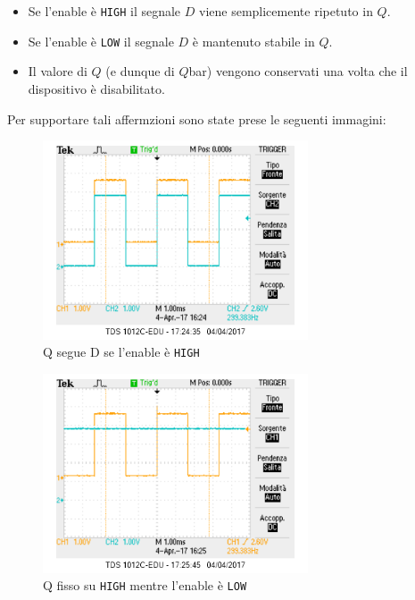 \documentclass[a4paper,10pt]{article}
\def\code#1{\texttt{#1}}
\begin{document}
\begin{itemize}
\item Se l'enable è \code{HIGH} il segnale $D$ viene semplicemente ripetuto in $Q$.
\item Se l'enable è \code{LOW} il segnale $D$ è mantenuto stabile in $Q$.
\item Il valore di $Q$ (e dunque di $Q$bar) vengono conservati una volta che il dispositivo è disabilitato.
\end{itemize}

Per supportare tali affermzioni sono state prese le seguenti immagini:


\begin{figure}[H]
	\centering
	\includegraphics[width=0.7\textwidth]{../grafici/enableUp.png}
	\caption{Q segue D se l'enable è \code{HIGH}}
	\label{fig:FFD}
\end{figure}

\begin{figure}[H]
	\centering
	\includegraphics[width=0.7\textwidth]{../grafici/EnableDown0.png}
	\caption{Q fisso su \code{HIGH} mentre l'enable è \code{LOW}}
	\label{fig:FFD}
\end{figure}
\end{document}
